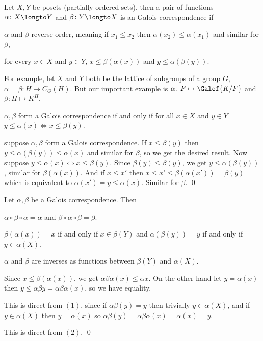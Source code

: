 \bdefn

    Let $X,Y$ be posets (partially ordered sets), then a pair of functions $\alpha\colon X\longto Y$ and $\beta\colon Y\longto X$ is an {\emphcolor Galois correspondence} if
    \benum
        \item $\alpha$ and $\beta$ reverse order, meaning if $x_1\leq x_2$ then $\alpha(x_2)\leq\alpha(x_1)$ and similar for $\beta$,
        \item for every $x\in X$ and $y\in Y$, $x\leq\beta(\alpha(x))$ and $y\leq\alpha(\beta(y))$.
    \eenum
\edefn

For example, let $X$ and $Y$ both be the lattice of subgroups of a group $G$, $\alpha=\beta\colon H\mapsto C_G(H)$.
But our important example is $\alpha\colon F\mapsto\Galof{K/F}$ and $\beta\colon H\mapsto K^H$.

\blemm

    $\alpha,\beta$ form a Galois correspondence if and only if for all $x\in X$ and $y\in Y$ $y\leq\alpha(x)\iff x\leq\beta(y)$.

\elemm

\Proof suppose $\alpha,\beta$ form a Galois correspondence.
If $x\leq\beta(y)$ then $y\leq\alpha(\beta(y))\leq\alpha(x)$ and similar for $\beta$, so we get the desired result.
Now suppose $y\leq\alpha(x)\iff x\leq\beta(y)$.
Since $\beta(y)\leq\beta(y)$, we get $y\leq\alpha(\beta(y))$, similar for $\beta(\alpha(x))$.
And if $x\leq x'$ then $x\leq x'\leq\beta(\alpha(x'))=\beta(y)$ which is equivalent to $\alpha(x')=y\leq\alpha(x)$.
Similar for $\beta$.
\qed

\bprop

    Let $\alpha,\beta$ be a Galois correspondence.
    Then
    \benum
        \item $\alpha\circ\beta\circ\alpha=\alpha$ and $\beta\circ\alpha\circ\beta=\beta$.
        \item $\beta(\alpha(x))=x$ if and only if $x\in\beta(Y)$ and $\alpha(\beta(y))=y$ if and only if $y\in\alpha(X)$.
        \item $\alpha$ and $\beta$ are inverses as functions between $\beta(Y)$ and $\alpha(X)$.
    \eenum

\eprop

\Proof 
\benum
    \item Since $x\leq\beta(\alpha(x))$, we get $\alpha\beta\alpha(x)\leq\alpha x$.
    On the other hand let $y=\alpha(x)$ then $y\leq\alpha\beta y=\alpha\beta\alpha(x)$, so we have equality.
    \item This is direct from $(1)$, since if $\alpha\beta(y)=y$ then trivially $y\in\alpha(X)$, and if $y\in\alpha(X)$ then $y=\alpha(x)$ so $\alpha\beta(y)=\alpha\beta\alpha(x)=\alpha(x)=y$.
    \item This is direct from $(2)$.
    \qed
\eenum

